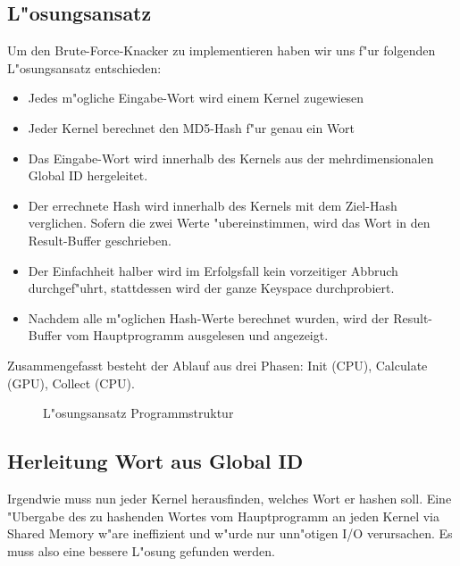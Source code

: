 \begin{refsection}



\section{L"osungsansatz}


Um den Brute-Force-Knacker zu implementieren haben wir uns f"ur folgenden
L"osungsansatz entschieden:

\begin{itemize}
	\item Jedes m"ogliche Eingabe-Wort wird einem Kernel zugewiesen
	\item Jeder Kernel berechnet den MD5-Hash f"ur genau ein Wort
	\item Das Eingabe-Wort wird innerhalb des Kernels aus der mehrdimensionalen
		Global ID hergeleitet.
	\item Der errechnete Hash wird innerhalb des Kernels mit dem Ziel-Hash
		verglichen. Sofern die zwei Werte "ubereinstimmen, wird das Wort in den
		Result-Buffer geschrieben.
	\item Der Einfachheit halber wird im Erfolgsfall kein vorzeitiger Abbruch
		durchgef"uhrt, stattdessen wird der ganze Keyspace durchprobiert.
	\item Nachdem alle m"oglichen Hash-Werte berechnet wurden, wird der
		Result-Buffer vom Hauptprogramm ausgelesen und angezeigt.
\end{itemize}

\noindent Zusammengefasst besteht der Ablauf aus drei Phasen: Init (CPU),
Calculate (GPU), Collect (CPU).

\begin{figure}[H]
	\centering
	
	\caption{L"osungsansatz Programmstruktur}
	\label{img:crypto:programm-struktur}
\end{figure}

\subsection{Herleitung Wort aus Global ID}

Irgendwie muss nun jeder Kernel herausfinden, welches Wort er hashen soll. Eine
"Ubergabe des zu hashenden Wortes vom Hauptprogramm an jeden Kernel via Shared
Memory w"are ineffizient und w"urde nur unn"otigen I/O verursachen. Es muss also
eine bessere L"osung gefunden werden.


\end{refsection}
